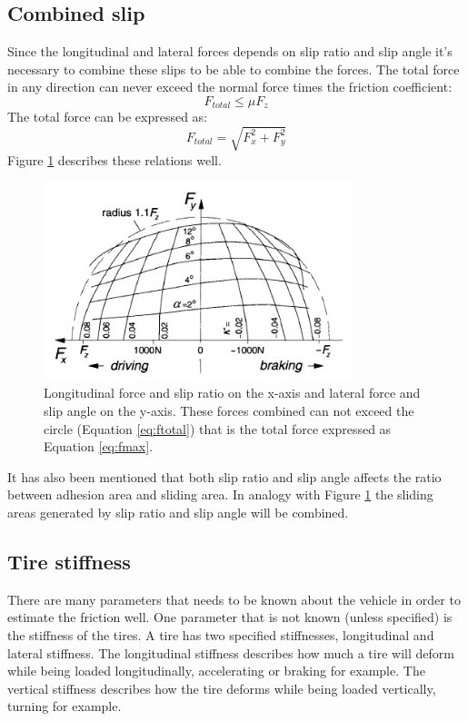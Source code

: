 \subsection{Combined slip}
Since the longitudinal and lateral forces depends on slip ratio and slip angle it's necessary to combine these slips to be able to combine the forces. The total force in any direction can never exceed the normal force times the friction coefficient:
\begin{equation}
F_{total} \leq \mu F_{z}
\label{eq:fmax}
\end{equation}
The total force can be expressed as:
\begin{equation}
F_{total} = \sqrt{F_{x}^{2}+F_{y}^{2}}
\label{eq:ftotal}
\end{equation}
Figure \ref{combined} describes these relations well.
\begin{figure}[h]
	\centering
	\includegraphics[width=0.8\textwidth]{Pictures/combined}
	\caption{Longitudinal force and slip ratio on the x-axis and lateral force and slip angle on the y-axis. These forces combined can not exceed the circle (Equation \ref{eq:ftotal}) that is the total force expressed as Equation \ref{eq:fmax}. \cite{pacejka}}
	\label{combined}
\end{figure}
It has also been mentioned that both slip ratio and slip angle affects the ratio between adhesion area and sliding area. In analogy with Figure \ref{combined} the sliding areas generated by slip ratio and slip angle will be combined.

\subsection{Tire stiffness}
\label{sec:tire_stiffness}
There are many parameters that needs to be known about the vehicle in order to estimate the friction well. One parameter that is not known (unless specified) is the stiffness of the tires. A tire has two specified stiffnesses, longitudinal and lateral stiffness. The longitudinal stiffness describes how much a tire will deform while being loaded longitudinally, accelerating or braking for example. The vertical stiffness describes how the tire deforms while being loaded vertically, turning for example.

